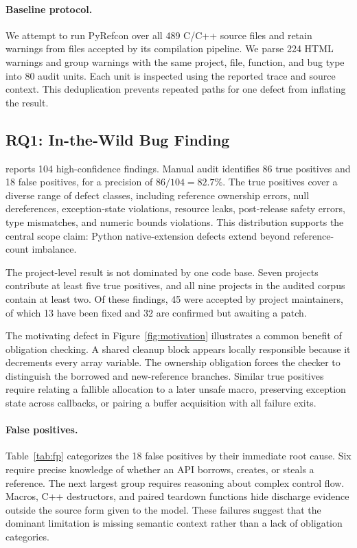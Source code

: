 \paragraph{Baseline protocol.}
We attempt to run PyRefcon over all 489 C/C++ source files and retain
warnings from files accepted by its compilation
pipeline. We parse 224 HTML warnings and group warnings with the same project,
file, function, and bug type into 80 audit units. Each unit is inspected using
the reported trace and source context. This deduplication prevents repeated
paths for one defect from inflating the result.

\subsection{RQ1: In-the-Wild Bug Finding}

\tool reports 104 high-confidence findings. Manual audit identifies 86 true
positives and 18 false positives, for a precision of
$86/104=82.7\%$. The true positives cover a diverse range of defect
classes, including reference ownership errors, null dereferences,
exception-state violations, resource leaks, post-release safety errors,
type mismatches, and numeric bounds violations. This distribution
supports the central scope claim: Python native-extension defects extend
beyond reference-count imbalance.

The project-level result is not dominated by one code base. Seven projects
contribute at least five true positives, and all nine projects in the audited
corpus contain at least two. Of these findings, 45 were accepted by project
maintainers, of which 13 have been fixed and 32 are confirmed but awaiting
a patch.

The motivating defect in Figure~\ref{fig:motivation} illustrates a common
benefit of obligation checking. A shared cleanup block appears locally
responsible because it decrements every array variable. The ownership
obligation forces the checker to distinguish the borrowed and new-reference
branches. Similar true positives require relating a fallible allocation to a
later unsafe macro, preserving exception state across callbacks, or pairing a
buffer acquisition with all failure exits.

\paragraph{False positives.}
Table~\ref{tab:fp} categorizes the 18 false positives by their immediate root
cause. Six require precise knowledge of whether an API borrows, creates, or
steals a reference. The next largest group requires reasoning about complex
control flow. Macros, C++ destructors, and paired teardown functions hide
discharge evidence outside the source form given to the model. These failures
suggest that the dominant limitation is missing semantic context rather than a
lack of obligation categories.

